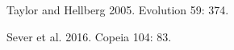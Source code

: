 \documentclass[t]{beamer}
\begin{document}
%
%
{
\begin{frame}[b]

\hfill\tiny Taylor and Hellberg 2005. Evolution 59: 374.
\end{frame}
}
%
{
\begin{frame}[b]

\hfill\tiny Sever et al. 2016. Copeia 104: 83.
\end{frame}
}
%
\end{document}
